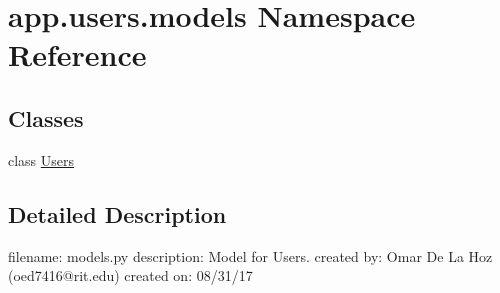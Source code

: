 \hypertarget{namespaceapp_1_1users_1_1models}{}\section{app.\+users.\+models Namespace Reference}
\label{namespaceapp_1_1users_1_1models}
\subsection*{Classes}
\begin{DoxyCompactItemize}
\item 
class \mbox{\hyperlink{classapp_1_1users_1_1models_1_1_users}{Users}}
\end{DoxyCompactItemize}


\subsection{Detailed Description}
\begin{DoxyVerb}filename: models.py
description: Model for Users.
created by: Omar De La Hoz (oed7416@rit.edu)
created on: 08/31/17
\end{DoxyVerb}
 